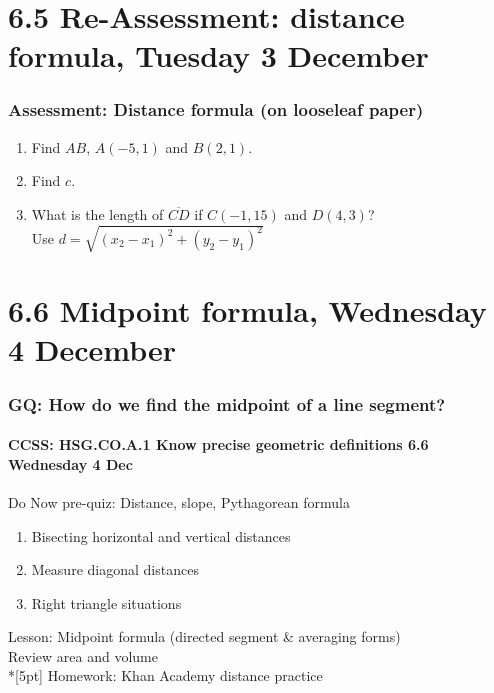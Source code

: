 \documentclass{beamer}
\begin{document}
  \section{6.5 Re-Assessment: distance formula, Tuesday 3 December}
  \frame
  {
    \frametitle{Assessment: Distance formula (on looseleaf paper)}
    \begin{enumerate}
      \item Find $AB$, $A(-5,1)$ and $B(2,1)$. \hspace{0.5cm}
         \vspace{1cm}
      \item Find $c$. \hspace{2cm}
         \vspace{0.5cm}
      \item What is the length of $\overline{CD}$ if $C(-1,15)$ and $D(4,3)$?\\[0.5cm]
        Use $\displaystyle d=\sqrt{(x_2-x_1)^2+(y_2-y_1)^2}$
    \end{enumerate}
  }

  \section{6.6 Midpoint formula, Wednesday 4 December}
  \frame
  {
    \frametitle{GQ: How do we find the midpoint of a line segment?}
    \framesubtitle{CCSS: HSG.CO.A.1 Know precise geometric definitions \hfill \alert{6.6 Wednesday 4 Dec}}

    \begin{block}{Do Now pre-quiz: Distance, slope, Pythagorean formula}
    \begin{enumerate}
      \item Bisecting horizontal and vertical distances
      \item Measure diagonal distances
      \item Right triangle situations
    \end{enumerate}
    \end{block}
    Lesson: Midpoint formula (directed segment \& averaging forms)\\
    Review area and volume \\*[5pt]
    Homework: Khan Academy distance practice
  }
\end{document}
